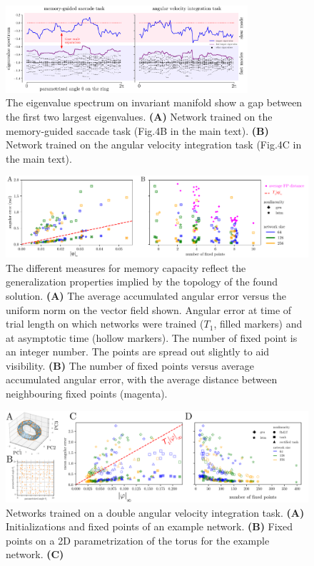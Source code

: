 \documentclass[letterpaper]{article}
\begin{document}
\begin{figure}[tbhp]
  \centering
  \includegraphics[width=0.8\textwidth]{eigenvalue_gap}
  \caption{The eigenvalue spectrum on invariant manifold show a gap between the first two largest eigenvalues.
    \textbf{(A)} Network trained on the memory-guided saccade task (Fig.4B in the main text).
    \textbf{(B)} Network trained on the angular velocity integration task (Fig.4C in the main text).
}\label{fig:eigenvalue_gap}
\end{figure}


\begin{figure}[tbhp]
  \centering
  \includegraphics[width=\textwidth]{angular_losses_lstm_gru}
  \caption{The different measures for memory capacity reflect the generalization properties implied by the topology of the found solution.
    \textbf{(A)} The average accumulated angular error versus the uniform norm on the vector field shown.
     Angular error at time of trial length on which networks were trained (\(T_1\), filled markers) and at asymptotic time (hollow markers).
      The number of fixed point is an integer number. The points are spread out slightly to aid visibility.
    \textbf{(B)}  The number of fixed points versus average accumulated angular error, with the average distance between neighbouring fixed points (magenta).
}\label{fig:angular_losses_lstm_gru}
\end{figure}


\begin{figure}[tbhp]
  \centering
  \includegraphics[width=\textwidth]{davit}
  \caption{Networks trained on a double angular velocity integration task.
    \textbf{(A)} Initializations and fixed points of an example network.
    \textbf{(B)} Fixed points on a 2D parametrization of the torus for the example network.
    \textbf{(C)}
}\label{fig:davit}
\end{figure}
\end{document}
